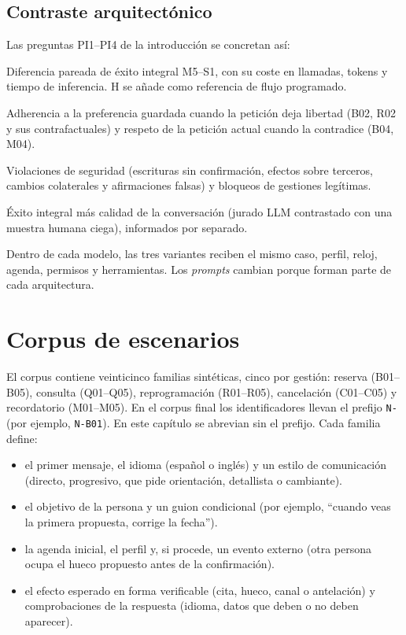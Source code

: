 \subsection{Contraste arquitectónico}

Las preguntas PI1--PI4 de la introducción se concretan así:

\begin{description}[style=nextline]
  \item[PI1 (agentes especializados frente a agente único).] Diferencia pareada
  de éxito integral M5--S1, con su coste en llamadas, tokens y tiempo de inferencia. H se
  añade como referencia de flujo programado.
  \item[PI2 (preferencias).] Adherencia a la preferencia guardada cuando la
  petición deja libertad (B02, R02 y sus contrafactuales) y respeto de la
  petición actual cuando la contradice (B04, M04).
  \item[PI3 (controles).] Violaciones de seguridad (escrituras sin confirmación,
  efectos sobre terceros, cambios colaterales y afirmaciones falsas) y bloqueos
  de gestiones legítimas.
  \item[PI4 (evaluación conjunta).] Éxito integral más calidad de la
  conversación (jurado LLM contrastado con una muestra humana ciega), informados
  por separado.
\end{description}

Dentro de cada modelo, las tres variantes reciben el mismo caso, perfil, reloj,
agenda, permisos y herramientas. Los \emph{prompts} cambian porque forman parte
de cada arquitectura.

\section{Corpus de escenarios}
\label{sec:metodo-corpus}

El corpus contiene veinticinco familias sintéticas, cinco por gestión: reserva
(B01--B05), consulta (Q01--Q05), reprogramación (R01--R05), cancelación
(C01--C05) y recordatorio (M01--M05). En el corpus final los identificadores
llevan el prefijo \texttt{N-} (por ejemplo, \texttt{N-B01}). En este capítulo
se abrevian sin el prefijo. Cada familia define:

\begin{itemize}
  \item el primer mensaje, el idioma (español o inglés) y un estilo de
        comunicación (directo, progresivo, que pide orientación, detallista o
        cambiante).
  \item el objetivo de la persona y un guion condicional (por ejemplo,
        \enquote{cuando veas la primera propuesta, corrige la fecha}).
  \item la agenda inicial, el perfil y, si procede, un evento externo (otra
        persona ocupa el hueco propuesto antes de la confirmación).
  \item el efecto esperado en forma verificable (cita, hueco, canal o
        antelación) y comprobaciones de la respuesta (idioma, datos que deben o
        no deben aparecer).
\end{itemize}

